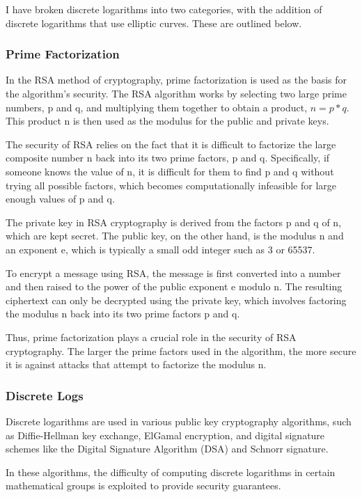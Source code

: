 \documentclass{article}
\begin{document}
I have broken discrete logarithms into two categories, with the addition of discrete logarithms that use elliptic curves. These are outlined below.

\subsubsection{Prime Factorization}

In the RSA method of cryptography, prime factorization is used as the basis for the algorithm's security. The RSA algorithm works by selecting two large prime numbers, p and q, and multiplying them together to obtain a product, $n = p*q$. This product n is then used as the modulus for the public and private keys.

The security of RSA relies on the fact that it is difficult to factorize the large composite number n back into its two prime factors, p and q. Specifically, if someone knows the value of n, it is difficult for them to find p and q without trying all possible factors, which becomes computationally infeasible for large enough values of p and q.

The private key in RSA cryptography is derived from the factors p and q of n, which are kept secret. The public key, on the other hand, is the modulus n and an exponent e, which is typically a small odd integer such as 3 or 65537.

To encrypt a message using RSA, the message is first converted into a number and then raised to the power of the public exponent e modulo n. The resulting ciphertext can only be decrypted using the private key, which involves factoring the modulus n back into its two prime factors p and q.

Thus, prime factorization plays a crucial role in the security of RSA cryptography. The larger the prime factors used in the algorithm, the more secure it is against attacks that attempt to factorize the modulus n.

\subsubsection{Discrete Logs}
Discrete logarithms are used in various public key cryptography algorithms, such as Diffie-Hellman key exchange, ElGamal encryption, and digital signature schemes like the Digital Signature Algorithm (DSA) and Schnorr signature.

In these algorithms, the difficulty of computing discrete logarithms in certain mathematical groups is exploited to provide security guarantees.
\end{document}
